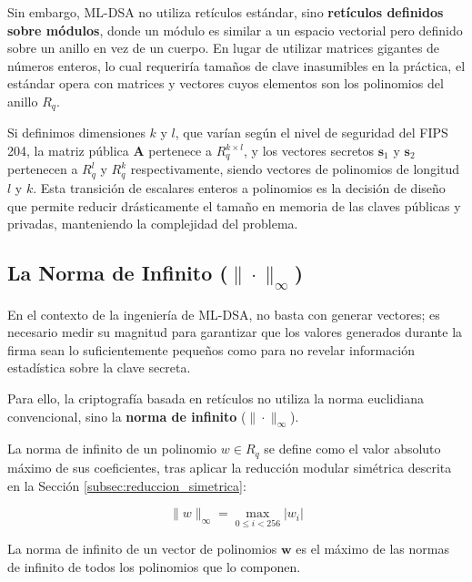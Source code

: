 \documentclass[11pt, a4paper]{report}
\theoremstyle{definition}
\begin{document}
Sin embargo, ML-DSA no utiliza retículos estándar, sino \textbf{retículos definidos sobre módulos}, donde un módulo es similar a un espacio vectorial pero definido sobre un anillo en vez de un cuerpo. En lugar de utilizar matrices gigantes de números enteros, lo cual requeriría tamaños de clave inasumibles en la práctica, el estándar opera con matrices y vectores cuyos elementos son los polinomios del anillo $R_q$. 

Si definimos dimensiones $k$ y $l$, que varían según el nivel de seguridad del FIPS 204, la matriz pública $\mathbf{A}$ pertenece a $R_q^{k \times l}$, y los vectores secretos $\mathbf{s}_1$ y $\mathbf{s}_2$ pertenecen a $R_q^l$ y $R_q^k$ respectivamente, siendo vectores de polinomios de longitud $l$ y $k$. Esta transición de escalares enteros a polinomios es la decisión de diseño que permite reducir drásticamente el tamaño en memoria de las claves públicas y privadas, manteniendo la complejidad del problema.

\subsection{La Norma de Infinito ($\| \cdot \|_\infty$)}

En el contexto de la ingeniería de ML-DSA, no basta con generar vectores; es necesario medir su magnitud para garantizar que los valores generados durante la firma sean lo suficientemente pequeños como para no revelar información estadística sobre la clave secreta. 

Para ello, la criptografía basada en retículos no utiliza la norma euclidiana convencional, sino la \textbf{norma de infinito} ($\| \cdot \|_\infty$). 

La norma de infinito de un polinomio $w \in R_q$ se define como el valor absoluto máximo de sus coeficientes, tras aplicar la reducción modular simétrica descrita en la Sección \ref{subsec:reduccion_simetrica}:

$$ \| w \|_\infty = \max_{0 \le i < 256} |w_i| $$

La norma de infinito de un vector de polinomios $\mathbf{w}$ es el máximo de las normas de infinito de todos los polinomios que lo componen. 
\end{document}
